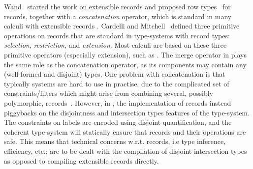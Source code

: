 Wand~\cite{wand1987complete} started the work on extensible records and proposed
row types~\cite{wand1989type} for records, together with a \emph{concatenation}
operator, which is standard in many calculi with extensible records
\cite{harper1991record,remy1992typing,wand1989type,sulzmann97designing,makholm05type,pottier2003constraint}.
Cardelli and Mitchell~\cite{cardelli1990operations} defined three primitive operations on
records that are standard in type-systems with record types: 
\emph{selection}, \emph{restriction}, and \emph{extension}. 
Most calculi are based on these three primitive operators (especially extension), such as
\cite{remy1993type,gaster1996polymorphic,jones99lightweight,leijen2004first,leijen2005extensible,blume2006extensible}.
The merge operator in \name plays the same role as the concatenation operator, as its components 
may contain any (well-formed and disjoint) types.
One problem with concatenation is that typically systems are hard to use in practise, due to the
complicated set of constraints/filters which might arise from combining several, possibly 
polymorphic, records~\cite{leijen2005extensible}.
However, in \name, the implementation of records instead piggybacks on the disjointness
and intersection types features of the type-system.
The constraints on labels are encoded using disjoint quantification, and the coherent
type-system will statically ensure that records and their operations are safe.
This means that technical concerns w.r.t. records, i.e type inference, efficiency, etc.; are to be dealt with the 
compilation of disjoint intersection types as opposed to compiling extensible records directly.


